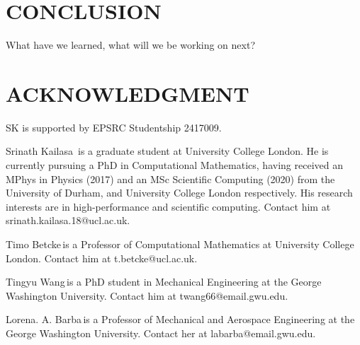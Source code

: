 \documentclass{IEEEcsmag}
\begin{document}
\section{CONCLUSION}

What have we learned, what will we be working on next?

\section{ACKNOWLEDGMENT}

SK is supported by EPSRC Studentship 2417009.




\begin{IEEEbiography}{Srinath Kailasa}{\,} is a graduate student at University College London. He is currently pursuing a PhD in Computational Mathematics, having received an MPhys in Physics (2017) and an MSc Scientific Computing (2020) from the University of Durham, and University College London respectively. His research interests are in high-performance and scientific computing. Contact him at srinath.kailasa.18@ucl.ac.uk.
\end{IEEEbiography}

\begin{IEEEbiography}{Timo Betcke}{\,}is a Professor of Computational Mathematics at University College London. Contact him at t.betcke@ucl.ac.uk.
\end{IEEEbiography}

\begin{IEEEbiography}{Tingyu Wang}{\,}is a PhD student in Mechanical Engineering at the George Washington University. Contact him at twang66@email.gwu.edu.
\end{IEEEbiography}

\begin{IEEEbiography}{Lorena. A. Barba}{\,}is a Professor of Mechanical and Aerospace Engineering at the George Washington University.  Contact her at labarba@email.gwu.edu.
\end{IEEEbiography}
\end{document}

